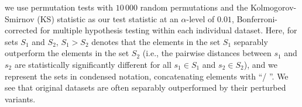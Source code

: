 \begin{table*}[!t]
{		we use permutation tests with $10\,000$ random permutations and the Kolmogorov-Smirnov (KS) statistic as our test statistic at an $\alpha$-level of $0.01$, Bonferroni-corrected for multiple hypothesis testing within each individual dataset. 
		Here, for sets $S_1$ and $S_2$, $S_1 > S_2$ denotes that the elements in the set $S_1$ separably outperform the elements in the set $S_2$ 
		(i.e., the pairwise distances between $s_1$ and $s_2$ are statistically significantly different for all $s_1\in S_1$ and $s_2\in S_2$), 
		and we represent the sets in condensed notation, concatenating elements with ``/
		''. 
		We see that original datasets are often separably outperformed by their perturbed variants. 
	}\label{tab:performance-separability-ks}
\end{table*}